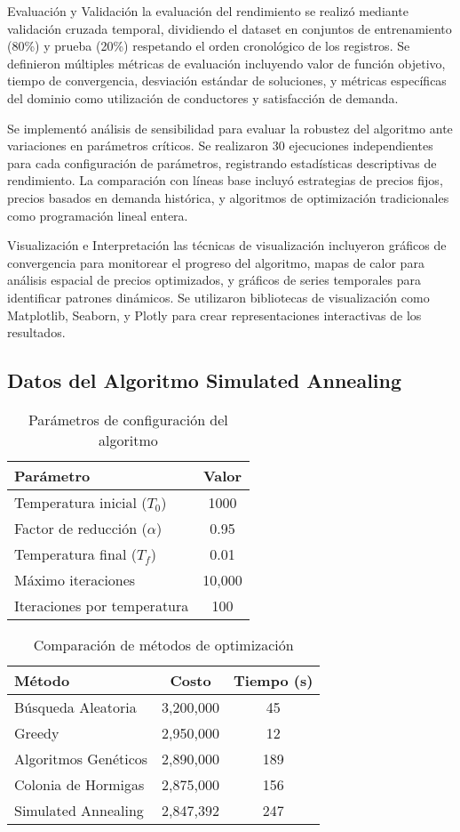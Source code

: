 \documentclass[conference]{IEEEtran}
\begin{document}
Evaluación y Validación la evaluación del rendimiento se realizó mediante validación cruzada temporal, dividiendo el dataset en conjuntos de entrenamiento (80\%) y prueba (20\%) respetando el orden cronológico de los registros. Se definieron múltiples métricas de evaluación incluyendo valor de función objetivo, tiempo de convergencia, desviación estándar de soluciones, y métricas específicas del dominio como utilización de conductores y satisfacción de demanda.

Se implementó análisis de sensibilidad para evaluar la robustez del algoritmo ante variaciones en parámetros críticos. Se realizaron 30 ejecuciones independientes para cada configuración de parámetros, registrando estadísticas descriptivas de rendimiento. La comparación con líneas base incluyó estrategias de precios fijos, precios basados en demanda histórica, y algoritmos de optimización tradicionales como programación lineal entera.

Visualización e Interpretación las técnicas de visualización incluyeron gráficos de convergencia para monitorear el progreso del algoritmo, mapas de calor para análisis espacial de precios optimizados, y gráficos de series temporales para identificar patrones dinámicos. Se utilizaron bibliotecas de visualización como Matplotlib, Seaborn, y Plotly para crear representaciones interactivas de los resultados.

\subsection{Datos del Algoritmo Simulated Annealing}

\begin{table}[h!]
\centering
\caption{Parámetros de configuración del algoritmo}
\begin{tabular}{@{}lc@{}}
\toprule
\textbf{Parámetro} & \textbf{Valor} \\
\midrule
Temperatura inicial ($T_0$) & 1000 \\
Factor de reducción ($\alpha$) & 0.95 \\
Temperatura final ($T_f$) & 0.01 \\
Máximo iteraciones & 10,000 \\
Iteraciones por temperatura & 100 \\
\bottomrule
\end{tabular}
\end{table}

\begin{table}[h!]
\centering
\caption{Comparación de métodos de optimización}
\begin{tabular}{@{}lcc@{}}
\toprule
\textbf{Método} & \textbf{Costo } & \textbf{Tiempo (s)} \\
\midrule
Búsqueda Aleatoria & 3,200,000 & 45 \\
Greedy & 2,950,000 & 12 \\
Algoritmos Genéticos & 2,890,000 & 189 \\
Colonia de Hormigas & 2,875,000 & 156 \\
Simulated Annealing & 2,847,392 & 247 \\
\bottomrule
\end{tabular}
\end{table}
\end{document}

